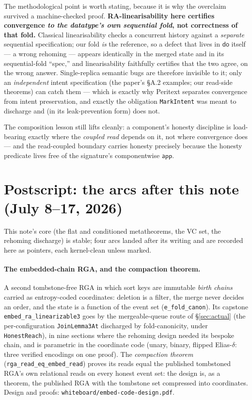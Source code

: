 \documentclass[11pt]{article}
\newcommand{\lean}[1]{\texttt{#1}}
\newcommand{\dodo}{\mathsf{do}}
\newcommand{\app}{\mathsf{app}}
\begin{document}
The methodological point is worth stating, because it is why the overclaim
survived a machine-checked proof. \textbf{RA-linearisability here certifies
convergence \emph{to the datatype's own sequential fold}, not correctness of
that fold.} Classical linearisability checks a concurrent history against a
\emph{separate} sequential specification; our fold \emph{is} the reference, so
a defect that lives in $\dodo$ itself --- a wrong rehoming --- appears
identically in the merged state and in its sequential-fold ``spec,'' and
linearisability faithfully certifies that the two agree, on the wrong answer.
Single-replica semantic bugs are therefore invisible to it; only an
\emph{independent} intent specification (the paper's \S A.2 examples; our
read-side theorems) can catch them --- which is exactly why Peritext separates
convergence from intent preservation, and exactly the obligation
\lean{MarkIntent} was meant to discharge and (in its leak-prevention form) does
not.

The composition lesson still lifts cleanly: a component's honesty discipline is
load-bearing exactly where the \emph{coupled read} depends on it, not where
convergence does --- and the read-coupled boundary carries honesty precisely
because the honesty predicate lives free of the signature's componentwise
$\app$.

\section{Postscript: the arcs after this note (July 8--17, 2026)}
\label{sec:postscript}

This note's core (the flat and conditioned metatheorems, the VC set, the
rehoming discharge) is stable; four arcs landed after its writing and are
recorded here as pointers, each kernel-clean unless marked.

\paragraph{The embedded-chain RGA, and the compaction theorem.} A second
tombstone-free RGA in which sort keys are immutable \emph{birth chains}
carried as entropy-coded coordinates: deletion is a filter, the merge never
decides an order, and the state is a function of the event set
(\lean{e\_fold\_canon}). Its capstone \lean{embed\_ra\_linearizable3} goes
by the mergeable-queue route of \S\ref{sec:actual} (the per-configuration
\lean{JoinLemma3At} discharged by fold-canonicity, under
\lean{HonestReach}), in nine sections where the rehoming design needed its
bespoke chain, and is parametric in the coordinate code (unary, binary,
flipped Elias-$\delta$: three verified encodings on one proof). The
\emph{compaction theorem} (\lean{rga\_read\_eq\_embed\_read}) proves its
reads equal the published tombstoned RGA's own relational reads on every
honest event set: the design is, as a theorem, the published RGA with the
tombstone set compressed into coordinates. Design and proofs:
\lean{whiteboard/embed-code-design.pdf}.
\end{document}
